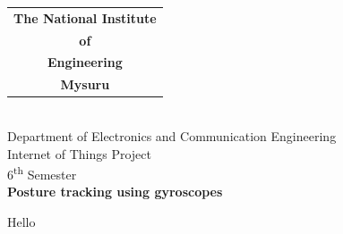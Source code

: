\documentclass[a4paper,12pt]{report}
\begin{document}
\begin{titlepage}
    \begin{center}
        \noindent
        \hfill
        \begin{tabular}{@{}c@{}}
            \textbf{\Large{The National Institute}}\\
            \textbf{\Large{of}}\\
            \textbf{\Large{Engineering}}\\
        \textbf{\Large{Mysuru}}
        \end{tabular}
        \hfill
         \\
        \vspace{5cm}
        \huge{Department of Electronics and Communication Engineering} \\
        \vspace{2cm}
        Internet of Things Project \\
        6\textsuperscript{th} Semester \\
        \vspace{1cm}
        \textbf{\huge{Posture tracking using gyroscopes}}
    \end{center}
\end{titlepage}
\clearpage
\restoregeometry
Hello
\end{document}
